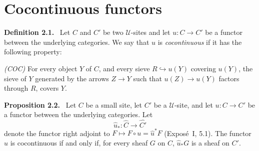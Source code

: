 \documentclass[11pt]{article}
\newcommand{\U}{\mathcal{U}}
\newenvironment{statement}[1]{\par\medskip\noindent\textbf{#1.}\ }{\par\medskip}
\begin{document}
\section{Cocontinuous functors}

\begin{statement}{Definition 2.1}
Let \(C\) and \(C'\) be two \(\U\)-sites and let \(u:C\to C'\) be a functor between the underlying categories. We say that \(u\) is \emph{cocontinuous} if it has the following property:

\emph{(COC)} For every object \(Y\) of \(C\), and every sieve \(R\hookrightarrow u(Y)\) covering \(u(Y)\), the sieve of \(Y\) generated by the arrows \(Z\to Y\) such that \(u(Z)\to u(Y)\) factors through \(R\), covers \(Y\).
\end{statement}

\begin{statement}{Proposition 2.2}
Let \(C\) be a small site, let \(C'\) be a \(\U\)-site, and let \(u:C\to C'\) be a functor between the underlying categories. Let
\[
\widehat u_{\ast}:\widehat C\to\widehat{C'}
\]
denote the functor right adjoint to \(F\mapsto F\circ u=\widehat u^{\ast}F\) (Expos\'e~I, 5.1). The functor \(u\) is cocontinuous if and only if, for every sheaf \(G\) on \(C\), \(\widehat u_{\ast}G\) is a sheaf on \(C'\).
\end{statement}
\end{document}
